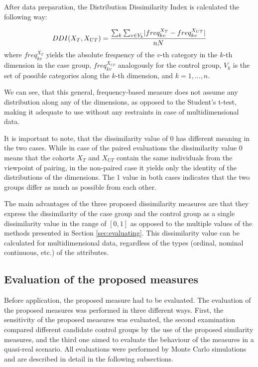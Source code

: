 After data preparation, the Distribution Dissimilarity Index is calculated the following way:

\begin{equation}
	DDI(X_T,X_{UT})=\frac{\sum_k\sum_{v\in V_k}\lvert freq^{X_T}_{kv} - freq^{X_{UT}}_{kv}\rvert}{nN}\label{eq:ddi}
\end{equation}
where $freq^{X_T}_{kv}$ yields the absolute frequency of the $v$-th category in the $k$-th dimension in the case group, $freq^{X_{UT}}_{kv}$ analogously for the control group, $V_k$ is the set of possible categories along the $k$-th dimension, and $k=1,...,n$.

We can see, that this general, frequency-based measure does not assume any distribution along any of the dimensions, as opposed to the Student's t-test, making it adequate to use without any restraints in case of multidimensional data. 

\vspace{0.5cm}

It is important to note, that the dissimilarity value of 0 has different meaning in the two cases. While in case of the paired evaluations the dissimilarity value 0 means that the cohorts $X_T$ and $X_{UT}$ contain the same individuals from the viewpoint of pairing, in the non-paired case it yields only the identity of the distributions of the dimensions. The 1 value in both cases indicates that the two groups differ as much as possible from each other.

The main advantages of the three proposed dissimilarity measures are that they express the dissimilarity of the case group and the control group as a single dissimilarity value in the range of $[0, 1]$ as opposed to the multiple values of the methods presented in Section \ref{sec:evaluating}. This dissimilarity value can be calculated for multidimensional data, regardless of the types (ordinal, nominal continuous, etc.) of the attributes.

\subsection{Evaluation of the proposed measures}
\label{sec:eval_res}

Before application, the proposed measure had to be evaluated. The evaluation of the proposed measures was performed in three different ways. First, the sensitivity of the proposed measures was evaluated, the second examination compared different candidate control groups by the use of the proposed similarity measures, and the third one aimed to evaluate the behaviour of the measures in a quasi-real scenario. All evaluations were performed by Monte Carlo simulations and are described in detail in the following subsections.

